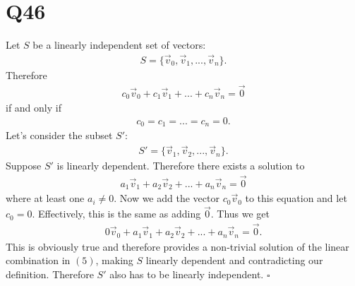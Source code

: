 \documentclass{article}
\begin{document}
\section*{Q46}
Let $S$ be a linearly independent set of vectors:
\begin{align}
    S=\{\vec v_0, \vec v_1, ..., \vec v_n\}.
\end{align}
Therefore
\begin{align}
    c_0\vec v_0 + c_1\vec v_1 + ... + c_n\vec v_n = \vec 0
\end{align}
if and only if
\begin{align}
    c_0 = c_1 = ... = c_n = 0.
\end{align}
Let's consider the subset $S'$:
\begin{align}
    S'=\{\vec v_1, \vec v_2, ..., \vec v_n\}.
\end{align}
Suppose $S'$ is linearly dependent. Therefore there exists a solution to
\begin{align}
    a_1\vec v_1 + a_2\vec v_2 + ... + a_n\vec v_n = \vec 0
\end{align}
where at least one $a_i\not=0$. Now we add the vector $c_0\vec v_0$ to this equation and let $c_0 = 0$.
Effectively, this is the same as adding $\vec 0$.
Thus we get
\begin{align}
    0\vec v_0 + a_1\vec v_1 + a_2\vec v_2 + ... + a_n\vec v_n = \vec 0.
\end{align}
This is obviously true and therefore provides a non-trivial solution of the linear combination in $(5)$, making $S$ linearly dependent and contradicting our definition.
Therefore $S'$ also has to be linearly independent. $\square$
\end{document}

